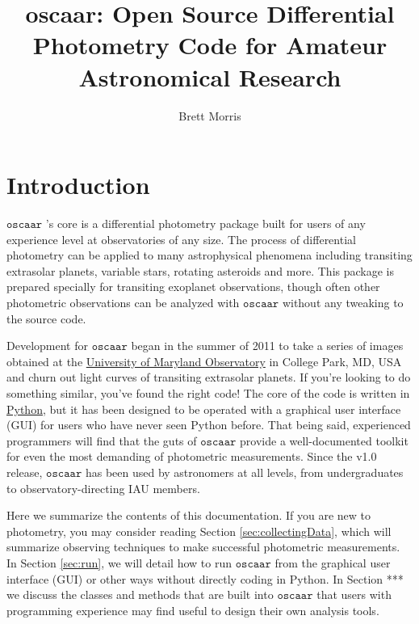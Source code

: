 \documentclass[a4paper]{article}
\begin{document}
\title{\textbf{oscaar}: Open Source Differential Photometry Code for Amateur Astronomical Research}
\author{Brett Morris}
\maketitle
\tableofcontents
\section{Introduction}

\newcommand{\oscaar}{$ \mathtt{oscaar}$ }
\newcommand{\code}[1]{\texttt{#1}}
\newcommand{\init}{\code{init.par}\ }

\oscaar's core is a differential photometry package built for users of any experience level at observatories of any size. The process of differential photometry can be applied to many astrophysical phenomena including transiting extrasolar planets, variable stars, rotating asteroids and more. This package is prepared specially for transiting exoplanet observations, though often other photometric observations can be analyzed with \oscaar without any tweaking to the source code.

Development for \oscaar began in the summer of 2011 to take a series of images obtained at the \href{http://www.astro.umd.edu/openhouse/}{University of Maryland Observatory} in College Park, MD, USA and churn out light curves of transiting extrasolar planets. If you're looking to do something similar, you've found the right code! The core of the code is written in \href{http://www.python.org/}{Python}, but it has been designed to be operated with a graphical user interface (GUI) for users who have never seen Python before. That being said, experienced programmers will find that the guts of \oscaar provide a well-documented toolkit for even the most demanding of photometric measurements. Since the v1.0 release, \oscaar has been used by astronomers at all levels, from undergraduates to observatory-directing IAU members.

Here we summarize the contents of this documentation. If you are new to photometry, you may consider reading Section \ref{sec:collectingData}, which will summarize observing techniques to make successful photometric measurements. In Section \ref{sec:run}, we will detail how to run \oscaar from the graphical user interface (GUI) or other ways without directly coding in Python. In Section *** we discuss the classes and methods that are built into \oscaar that users with programming experience may find useful to design their own analysis tools. 
\end{document}
